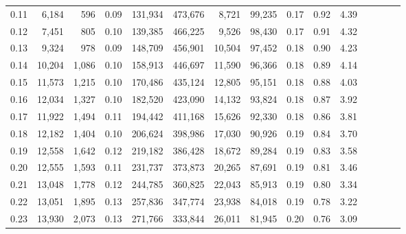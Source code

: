 \begin{tabular}{rrrcrrrrrrrrrrr}
0.11 &   6,184 &    596 &                                       0.09 &  131,934 &  473,676 &    8,721 &   99,235 &  0.17 &  0.92 &                         4.39 \\
0.12 &   7,451 &    805 &                                       0.10 &  139,385 &  466,225 &    9,526 &   98,430 &  0.17 &  0.91 &                         4.32 \\
0.13 &   9,324 &    978 &                                       0.09 &  148,709 &  456,901 &   10,504 &   97,452 &  0.18 &  0.90 &                         4.23 \\
0.14 &  10,204 &  1,086 &                                       0.10 &  158,913 &  446,697 &   11,590 &   96,366 &  0.18 &  0.89 &                         4.14 \\
0.15 &  11,573 &  1,215 &                                       0.10 &  170,486 &  435,124 &   12,805 &   95,151 &  0.18 &  0.88 &                         4.03 \\
0.16 &  12,034 &  1,327 &                                       0.10 &  182,520 &  423,090 &   14,132 &   93,824 &  0.18 &  0.87 &                         3.92 \\
0.17 &  11,922 &  1,494 &                                       0.11 &  194,442 &  411,168 &   15,626 &   92,330 &  0.18 &  0.86 &                         3.81 \\
0.18 &  12,182 &  1,404 &                                       0.10 &  206,624 &  398,986 &   17,030 &   90,926 &  0.19 &  0.84 &                         3.70 \\
0.19 &  12,558 &  1,642 &                                       0.12 &  219,182 &  386,428 &   18,672 &   89,284 &  0.19 &  0.83 &                         3.58 \\
0.20 &  12,555 &  1,593 &                                       0.11 &  231,737 &  373,873 &   20,265 &   87,691 &  0.19 &  0.81 &                         3.46 \\
0.21 &  13,048 &  1,778 &                                       0.12 &  244,785 &  360,825 &   22,043 &   85,913 &  0.19 &  0.80 &                         3.34 \\
0.22 &  13,051 &  1,895 &                                       0.13 &  257,836 &  347,774 &   23,938 &   84,018 &  0.19 &  0.78 &                         3.22 \\
0.23 &  13,930 &  2,073 &                                       0.13 &  271,766 &  333,844 &   26,011 &   81,945 &  0.20 &  0.76 &                         3.09 \\

\end{tabular}
